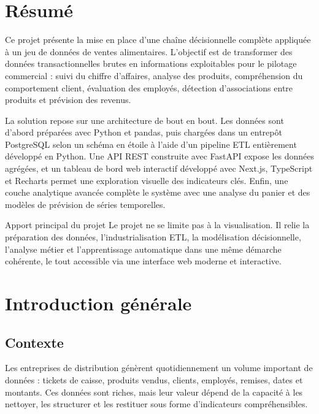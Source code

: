 \documentclass[12pt,a4paper,twoside]{report}
\begin{document}
\chapter*{Résumé}

Ce projet présente la mise en place d'une chaîne décisionnelle complète appliquée à un jeu de données de ventes alimentaires. L'objectif est de transformer des données transactionnelles brutes en informations exploitables pour le pilotage commercial : suivi du chiffre d'affaires, analyse des produits, compréhension du comportement client, évaluation des employés, détection d'associations entre produits et prévision des revenus.

La solution repose sur une architecture de bout en bout. Les données sont d'abord préparées avec Python et pandas, puis chargées dans un entrepôt PostgreSQL selon un schéma en étoile à l'aide d'un pipeline ETL entièrement développé en Python. Une API REST construite avec FastAPI expose les données agrégées, et un tableau de bord web interactif développé avec Next.js, TypeScript et Recharts permet une exploration visuelle des indicateurs clés. Enfin, une couche analytique avancée complète le système avec une analyse du panier et des modèles de prévision de séries temporelles.

\begin{infobox}{Apport principal du projet}
Le projet ne se limite pas à la visualisation. Il relie la préparation des données, l'industrialisation ETL, la modélisation décisionnelle, l'analyse métier et l'apprentissage automatique dans une même démarche cohérente, le tout accessible via une interface web moderne et interactive.
\end{infobox}

\chapter{Introduction générale}

\section{Contexte}

Les entreprises de distribution génèrent quotidiennement un volume important de données : tickets de caisse, produits vendus, clients, employés, remises, dates et montants. Ces données sont riches, mais leur valeur dépend de la capacité à les nettoyer, les structurer et les restituer sous forme d'indicateurs compréhensibles.
\end{document}
